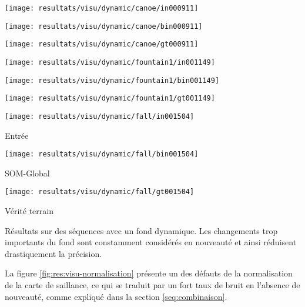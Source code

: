 	\begin{figureth}
		\begin{subfigureth}{.32\textwidth}
			\texttt{[image: resultats/visu/dynamic/canoe/in000911]}
		\end{subfigureth}
		\begin{subfigureth}{.32\textwidth}
			\texttt{[image: resultats/visu/dynamic/canoe/bin000911]}
		\end{subfigureth}
		\begin{subfigureth}{.32\textwidth}
			\texttt{[image: resultats/visu/dynamic/canoe/gt000911]}
		\end{subfigureth}

		\begin{subfigureth}{.32\textwidth}
			\texttt{[image: resultats/visu/dynamic/fountain1/in001149]}
		\end{subfigureth}
		\begin{subfigureth}{.32\textwidth}
			\texttt{[image: resultats/visu/dynamic/fountain1/bin001149]} 
		\end{subfigureth}
		\begin{subfigureth}{.32\textwidth}
			\texttt{[image: resultats/visu/dynamic/fountain1/gt001149]} 
		\end{subfigureth}

		\begin{subfigureth}{.32\textwidth}
			\texttt{[image: resultats/visu/dynamic/fall/in001504]} \caption{Entrée}
		\end{subfigureth}
		\begin{subfigureth}{.32\textwidth}
			\texttt{[image: resultats/visu/dynamic/fall/bin001504]} \caption{SOM-Global}
		\end{subfigureth}
		\begin{subfigureth}{.32\textwidth}
			\texttt{[image: resultats/visu/dynamic/fall/gt001504]} \caption{Vérité terrain}
		\end{subfigureth}
		\caption[Visualisation résultats dynamiques]{Résultats sur des séquences avec un fond dynamique. Les changements trop importants du fond sont constamment considérés en nouveauté et ainsi réduisent drastiquement la précision.}\label{fig:res:visu-dynamic}
	\end{figureth}

	La figure \ref{fig:res:visu-normalisation} présente un des défauts de la normalisation de la carte de saillance, ce qui se traduit par un fort taux de bruit en l'absence de nouveauté, comme expliqué dans la section \ref{seq:combinaison}.

